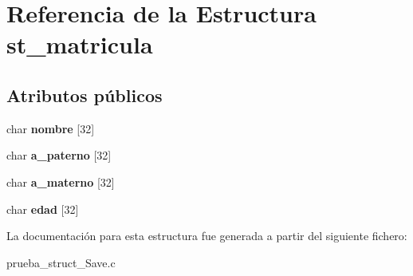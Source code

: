 \hypertarget{structst__matricula}{}\section{Referencia de la Estructura st\+\_\+matricula}
\label{structst__matricula}
\subsection*{Atributos públicos}
\begin{DoxyCompactItemize}
\item 
char {\bfseries nombre} \mbox{[}32\mbox{]}\hypertarget{structst__matricula_a0c794e47533739b0f1f256bd3e436aa6}{}\label{structst__matricula_a0c794e47533739b0f1f256bd3e436aa6}

\item 
char {\bfseries a\+\_\+paterno} \mbox{[}32\mbox{]}\hypertarget{structst__matricula_af8b14fc5ffcf0b4b4b1d419abba69cec}{}\label{structst__matricula_af8b14fc5ffcf0b4b4b1d419abba69cec}

\item 
char {\bfseries a\+\_\+materno} \mbox{[}32\mbox{]}\hypertarget{structst__matricula_a08035ee68cc61eb031681664f2e16867}{}\label{structst__matricula_a08035ee68cc61eb031681664f2e16867}

\item 
char {\bfseries edad} \mbox{[}32\mbox{]}\hypertarget{structst__matricula_a27953232bd68dccaeca72f48e9659f48}{}\label{structst__matricula_a27953232bd68dccaeca72f48e9659f48}

\end{DoxyCompactItemize}


La documentación para esta estructura fue generada a partir del siguiente fichero\+:\begin{DoxyCompactItemize}
\item 
prueba\+\_\+struct\+\_\+\+Save.\+c\end{DoxyCompactItemize}
